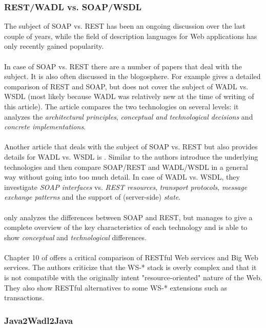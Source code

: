 \subsubsection{REST/WADL vs. SOAP/WSDL}
The subject of SOAP vs. REST has been an ongoing discussion over the last couple of years, while the field of description languages for Web applications has only recently gained popularity.
\\ \\
In case of SOAP vs. REST there are a number of papers that deal with the subject. It is also often discussed in the blogosphere. For example \cite{BIGREST} gives a detailed comparison of REST and SOAP, but does not cover the subject of WADL vs. WSDL (most likely because WADL was relatively new at the time of writing of this article). The article compares the two technologies on several levels: it analyzes the \emph{architectural principles}, \emph{conceptual and technological decisions} and \emph{concrete implementations}.
\\ \\
Another article that deals with the subject of SOAP vs. REST but also provides details for WADL vs. WSDL is \cite{WADLWSDL}. Similar to \cite{BIGREST} the authors introduce the underlying technologies and then compare SOAP/REST and WADL/WSDL in a general way without going into too much detail. In case of WADL vs. WSDL, they investigate \emph{SOAP interfaces} vs. \emph{REST resources}, \emph{transport protocols}, \emph{message exchange patterns} and the support of (server-side) \emph{state}.
\\ \\
\cite{BRINGBACKWEB} only analyzes the differences between SOAP and REST, but manages to give a complete overview of the key characteristics of each technology and is able to show \emph{conceptual} and \emph{technological} differences.
\\ \\
Chapter 10 of \cite{RESTFULWEB} offers a critical comparison of RESTful Web services and Big Web services. The authors criticize that the WS-* stack is overly complex and that it is not compatible with the originally intent "resource-oriented" nature of the Web. They also show RESTful alternatives to some WS-* extensions such as transactions.

\subsubsection{Java2Wadl2Java}

